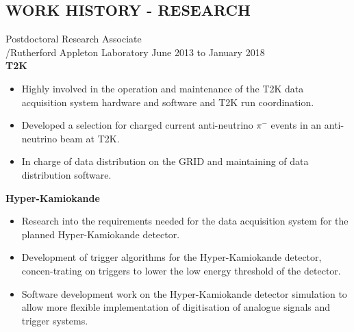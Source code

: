 \documentclass[margin]{res}
\begin{document}
 
 

\address{{\bf Contact Information} \\ 90 Charing Cres. \\ Fredericton, New Brunswick \\ E3B 4R7 \\ Canada }

\address{\textit{Phone} +15064721173 \\ \textit{Skype-in} +81(0)5031368145 \\ \textit{E-mail} stewartt1982@gmail.com}

 
\begin{resume} 

\section{WORK HISTORY - RESEARCH}
Postdoctoral Research Associate\\/Rutherford Appleton Laboratory \hfill June 2013 to January 2018\\
{\bf T2K}
\begin{itemize} \itemsep -2pt
\item Highly involved in the operation and maintenance of the T2K data acquisition system hardware and software and T2K run coordination.
\item Developed a selection for charged current anti-neutrino $\pi^{-}$ events in an anti-neutrino beam at T2K.
\item In charge of data distribution on the GRID and maintaining of data distribution software.
\end{itemize}

{\bf Hyper-Kamiokande}
\begin{itemize} \itemsep -2pt
\item Research into the requirements needed for the data acquisition system for the planned Hyper-Kamiokande detector.
\item Development of trigger algorithms for the Hyper-Kamiokande detector, concen-trating on triggers to lower the low energy threshold of the detector.
\item Software development work on the Hyper-Kamiokande detector simulation to allow more flexible implementation of digitisation of analogue signals and trigger systems.
\end{itemize}


\end{resume}
\end{document}
